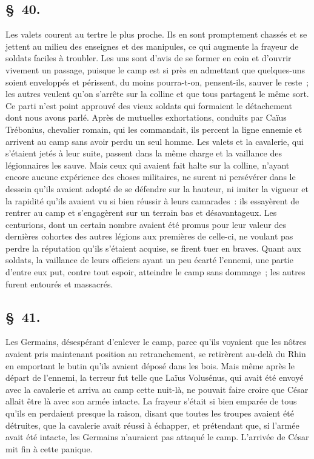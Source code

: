 \documentclass[french,twoside]{book} %
\begin{document}
\subsection[{§ 40.}]{ \textsc{§ 40.} }
\noindent Les valets courent au tertre le plus proche. Ils en sont promptement chassés et se jettent au milieu des enseignes et des manipules, ce qui augmente la frayeur de soldats faciles à troubler. Les uns sont d’avis de se former en coin et d’ouvrir vivement un passage, puisque le camp est si près en admettant que quelques-uns soient enveloppés et périssent, du moins pourra-t-on, pensent-ils, sauver le reste ; les autres veulent qu’on s’arrête sur la colline et que tous partagent le même sort. Ce parti n’est point approuvé des vieux soldats qui formaient le détachement dont nous avons parlé. Après de mutuelles exhortations, conduits par Caïus Trébonius, chevalier romain, qui les commandait, ils percent la ligne ennemie et arrivent au camp sans avoir perdu un seul homme. Les valets et la cavalerie, qui s’étaient jetés à leur suite, passent dans la même charge et la vaillance des légionnaires les sauve. Mais ceux qui avaient fait halte sur la colline, n’ayant encore aucune expérience des choses militaires, ne surent ni persévérer dans le dessein qu’ils avaient adopté de se défendre sur la hauteur, ni imiter la vigueur et la rapidité qu’ils avaient vu si bien réussir à leurs camarades : ils essayèrent de rentrer au camp et s’engagèrent sur un terrain bas et désavantageux. Les centurions, dont un certain nombre avaient été promus pour leur valeur des dernières cohortes des autres légions aux premières de celle-ci, ne voulant pas perdre la réputation qu’ils s’étaient acquise, se firent tuer en braves. Quant aux soldats, la vaillance de leurs officiers ayant un peu écarté l’ennemi, une partie d’entre eux put, contre tout espoir, atteindre le camp sans dommage ; les autres furent entourés et massacrés.
\subsection[{§ 41.}]{ \textsc{§ 41.} }
\noindent Les Germains, désespérant d’enlever le camp, parce qu’ils voyaient que les nôtres avaient pris maintenant position au retranchement, se retirèrent au-delà du Rhin en emportant le butin qu’ils avaient déposé dans les bois. Mais même après le départ de l’ennemi, la terreur fut telle que Laïus Volusénus, qui avait été envoyé avec la cavalerie et arriva au camp cette nuit-là, ne pouvait faire croire que César allait être là avec son armée intacte. La frayeur s’était si bien emparée de tous qu’ils en perdaient presque la raison, disant que toutes les troupes avaient été détruites, que la cavalerie avait réussi à échapper, et prétendant que, si l’armée avait été intacte, les Germains n’auraient pas attaqué le camp. L'arrivée de César mit fin à cette panique.
\end{document}
